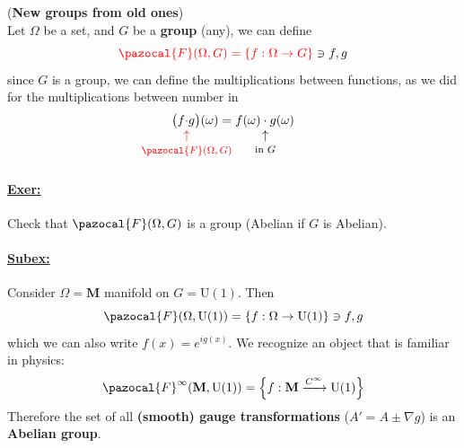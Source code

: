 \documentclass[../main.tex]{subfiles}
\begin{document}
\begin{example}(\textbf{New groups from old ones})\\
Let $\Omega$ be a set, and $G$ be a \textbf{group} (any), we can define
\[
{\color{red}\pazocal{F}(\Omega,G)=\qty{f:\Omega \to G}}\ni f,g
\]
since $G$ is a group, we can define the multiplications between functions, as we did for the multiplications between number in 
\[
\big(f{\color{red}\underset{\mathclap{\tikz \node {$\uparrow$} node [below=1ex]{\footnotesize $\pazocal{F}(\Omega,G)$ };}}{\cdot}}g\big)(\omega)=f(\omega)\underset{\mathclap{\tikz \node {$\uparrow$} node [below=1ex]{\footnotesize in $G$ };}}{\cdot}g(\omega)
\]
\paragraph{\underline{Exer:}} Check that $\pazocal{F}(\Omega,G)$ is a group (Abelian if $G$ is Abelian).
\paragraph{\underline{Subex:}} Consider $\Omega=\mathbf{M}$ manifold on $G=\textrm{U}(1)$. Then
\[
{\pazocal{F}(\Omega,\textrm{U}(1))=\qty{f:\Omega \to \textrm{U}(1)}}\ni f,g
\]
which we can also write $f(x)=e^{ig(x)}$. We recognize an object that is familiar in physics:
\[
{\pazocal{F}^\infty(\mathbf{M},\textrm{U}(1))=\qty{f:\mathbf{M} \xrightarrow{C^\infty} \textrm{U}(1)}}
\]
Therefore the set of all \textbf{(smooth) gauge transformations} ($A'=A\pm \nabla g$) is an \textbf{Abelian group}. 
\end{example}
\end{document}
